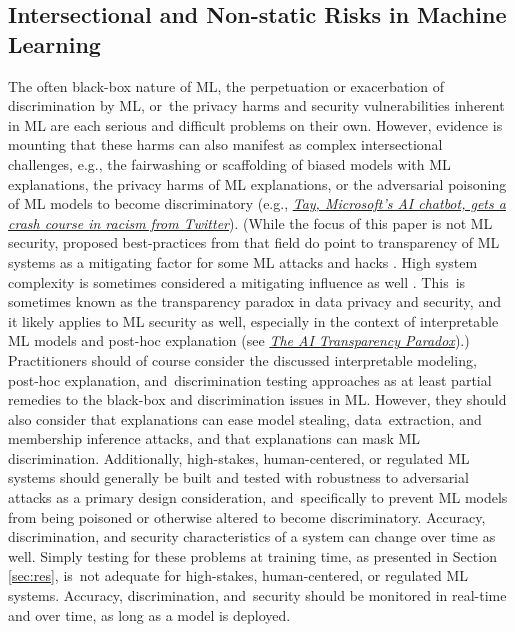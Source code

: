 \documentclass[information,article,accept,moreauthors,pdftex]{Definitions/mdpi}
\begin{document}
\subsection{Intersectional and Non-static Risks in Machine Learning}

The often black-box nature of ML, the perpetuation or exacerbation of discrimination by ML, or~the privacy harms and security vulnerabilities inherent in ML are each serious and difficult problems on their own. However, evidence is mounting that these harms can also manifest as complex intersectional challenges, e.g., the {fairwashing} or {scaffolding} of biased models with ML explanations, the privacy harms of ML explanations, or the adversarial poisoning of ML models to become discriminatory \cite{shokri2019privacy,fair_washing,scaffolding} (e.g., \href{https://www.theguardian.com/technology/2016/mar/24/tay-microsofts-ai-chatbot-gets-a-crash-course-in-racism-from-twitter} 
 {\textit{Tay, Microsoft's AI chatbot, gets a crash course in racism from Twitter}}). (While the focus of this paper is not ML security, proposed best-practices from that field do point to transparency of ML systems as a mitigating factor for some ML attacks and hacks \cite{papernot2018marauder}. High system complexity is sometimes considered a mitigating influence as well \cite{hoare19811980}. This~is sometimes known as the {transparency paradox} in data privacy and security, and it likely applies to ML security as well, especially in the context of interpretable ML models and post-hoc explanation (see \href{https://hbr.org/2019/12/the-ai-transparency-paradox}{\textit{The AI Transparency Paradox}}).) Practitioners should of course consider the discussed interpretable modeling, post-hoc explanation, and~discrimination testing approaches as at least partial remedies to the black-box and discrimination issues in ML. However, they should also consider that explanations can ease model stealing, data~extraction, and membership inference attacks, and that explanations can mask ML discrimination. Additionally, high-stakes, human-centered, or regulated ML systems should generally be built and tested with robustness to adversarial attacks as a primary design consideration, and~specifically to prevent ML models from being poisoned or otherwise altered to become discriminatory. Accuracy, discrimination, and security characteristics of a system can change over time as well. Simply testing for these problems at training time, as presented in Section \ref{sec:res}, is~not adequate for high-stakes, human-centered, or regulated ML systems. Accuracy, discrimination, and~security should be monitored in real-time and over time, as long as a model is deployed. %
\end{document}
